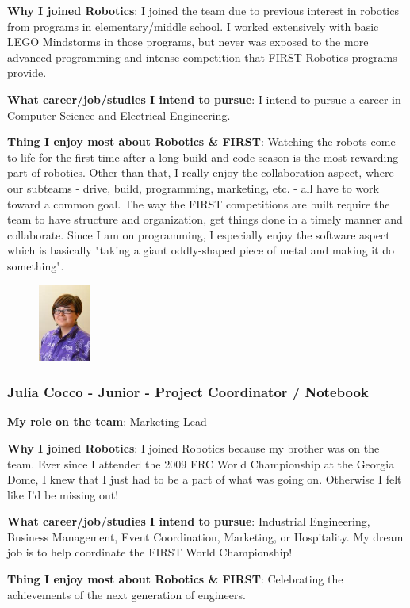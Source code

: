 {\bf Why I joined Robotics}: I joined the team due to previous interest in robotics from programs in elementary/middle school. I worked extensively with basic LEGO Mindstorms in those programs, but never was exposed to the more advanced programming and intense competition that FIRST Robotics programs provide.
	    
{\bf What career/job/studies I intend to pursue}: I intend to pursue a career in Computer Science and Electrical Engineering.
	
{\bf Thing I enjoy most about Robotics \& FIRST}: Watching the robots come to life for the first time after a long build and code season is the most rewarding part of robotics. Other than that, I really enjoy the collaboration aspect, where our subteams - drive, build, programming, marketing, etc. - all have to work toward a common goal.  The way the FIRST competitions are built require the team to have structure and organization, get things done in a timely manner and collaborate. Since I am on programming, I especially enjoy the software aspect which is basically "taking a giant oddly-shaped piece of metal and making it do something".

\begin{figure}
	\centering
	\includegraphics[height=1in]{julia}
\end{figure}
\subsubsection{Julia Cocco - Junior - Project Coordinator / Notebook}
{\bf My role on the team}: Marketing Lead

{\bf Why I joined Robotics}: I joined Robotics because my brother was on the team. Ever since I attended the 2009 FRC World Championship at the Georgia Dome, I knew that I just had to be a part of what was going on. Otherwise I felt like I'd be missing out! 

{\bf What career/job/studies I intend to pursue}: Industrial Engineering, Business Management, Event Coordination, Marketing, or Hospitality. My dream job is to help coordinate the FIRST World Championship! 

{\bf Thing I enjoy most about Robotics \& FIRST}: Celebrating the achievements of the next generation of engineers.

